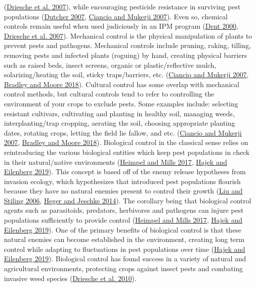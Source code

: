 \documentclass{ufdissertation}[overrideChapters] %
\begin{document}
{(\protect\hyperlink{ref-Driesche2007}{Driesche et al. 2007}), while encouraging pesticide resistance in surviving pest populations (\protect\hyperlink{ref-Dutcher2007}{Dutcher 2007}, \protect\hyperlink{ref-Ciancio2007}{Ciancio and Mukerji 2007}). Even so, chemical controls remain useful when used judiciously in an IPM program (\protect\hyperlink{ref-Dent2000}{Dent 2000}, \protect\hyperlink{ref-Driesche2007}{Driesche et al. 2007}). Mechanical control is the physical manipulation of plants to prevent pests and pathogens. Mechanical controls include pruning, raking, tilling, removing pests and infected plants (roguing) by hand, creating physical barriers such as raised beds, insect screens, organic or plastic/reflective mulch, solarizing/heating the soil, sticky traps/barriers, etc. (\protect\hyperlink{ref-Ciancio2007}{Ciancio and Mukerji 2007}, \protect\hyperlink{ref-Bradley2018}{Bradley and Moore 2018}). Cultural control has some overlap with mechanical control methods, but cultural controls tend to refer to controlling the environment of your crops to exclude pests. Some examples include: selecting resistant cultivars, cultivating and planting in healthy soil, managing weeds, interplanting/trap cropping, aerating the soil, choosing appropriate planting dates, rotating crops, letting the field lie fallow, and etc. (\protect\hyperlink{ref-Ciancio2007}{Ciancio and Mukerji 2007}, \protect\hyperlink{ref-Bradley2018}{Bradley and Moore 2018}). Biological control in the classical sense relies on reintroducing the various biological entities which keep pest populations in check in their natural/native environments (\protect\hyperlink{ref-Heimpel2017}{Heimpel and Mills 2017}, \protect\hyperlink{ref-Hajek2019}{Hajek and Eilenberg 2019}). This concept is based off of the enemy release hypotheses from invasion ecology, which hypothesizes that introduced pest populations flourish because they have no natural enemies present to control their growth (\protect\hyperlink{ref-Liu2006}{Liu and Stiling 2006}, \protect\hyperlink{ref-Heger2014}{Heger and Jeschke 2014}). The corollary being that biological control agents such as parasitoids, predators, herbivores and pathogens can injure pest populations sufficiently to provide control (\protect\hyperlink{ref-Heimpel2017}{Heimpel and Mills 2017}, \protect\hyperlink{ref-Hajek2019}{Hajek and Eilenberg 2019}). One of the primary benefits of biological control is that these natural enemies can become established in the environment, creating long term control while adapting to fluctuations in pest populations over time (\protect\hyperlink{ref-Hajek2019}{Hajek and Eilenberg 2019}). Biological control has found success in a variety of natural and agricultural environments, protecting crops against insect pests and combating invasive weed species (\protect\hyperlink{ref-Driesche2010}{Driesche et al. 2010}).
\begin{figure}


\end{figure}}
\end{document}
